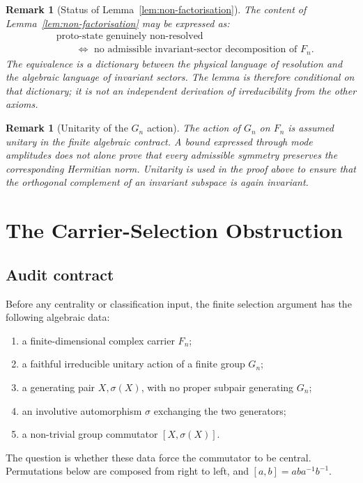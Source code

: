 \documentclass[11pt,a4paper]{article}
\newtheorem{remark}[theorem]{Remark}
\begin{document}
  \begin{remark}[Status of Lemma~\ref{lem:non-factorisation}]
    \label{rem:restatement}
    The content of Lemma~\ref{lem:non-factorisation} may be expressed as:
    \begin{equation}
      \begin{aligned}
        &\text{proto-state genuinely non-resolved}\\
        &\qquad\Longleftrightarrow
        \text{ no admissible invariant-sector decomposition of }F_n.
      \end{aligned}
    \end{equation}
    The equivalence is a dictionary between the physical language of resolution
    and the algebraic language of invariant sectors.
    The lemma is therefore conditional on that dictionary; it is not an
    independent derivation of irreducibility from the other axioms.
  \end{remark}

  \begin{remark}[Unitarity of the $G_n$ action]
    \label{rem:unitarity}
    The action of $G_n$ on $F_n$ is assumed unitary in the finite algebraic
    contract.
    A bound expressed through mode amplitudes does not alone prove that every
    admissible symmetry preserves the corresponding Hermitian norm.
    Unitarity is used in the proof above to ensure that the orthogonal complement
    of an invariant subspace is again invariant.
  \end{remark}

  \section{The Carrier-Selection Obstruction}
  \label{sec:main}

  \subsection{Audit contract}

    Before any centrality or classification input, the finite selection argument
    has the following algebraic data:
    \begin{enumerate}
      \item a finite-dimensional complex carrier $F_n$;
      \item a faithful irreducible unitary action of a finite group $G_n$;
      \item a generating pair $X,\sigma(X)$, with no proper subpair generating $G_n$;
      \item an involutive automorphism $\sigma$ exchanging the two generators;
      \item a non-trivial group commutator $[X,\sigma(X)]$.
    \end{enumerate}
    The question is whether these data force the commutator to be central.
    Permutations below are composed from right to left, and
    $[a,b]=aba^{-1}b^{-1}$.
\end{document}
